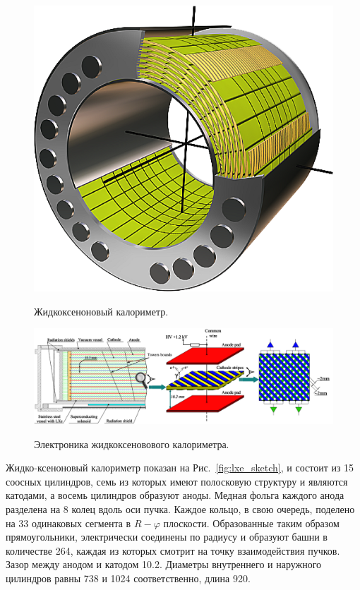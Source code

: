 \begin{figure}[htbp]
    \begin{minipage}[t]{0.27\textwidth}
        \centering
        \includegraphics[width=\textwidth]{img/cmd3_detector/lxe_sketch.png}
        \label{fig:lxe_sketch}
        \caption{Жидкоксеноновый калориметр.}
    \end{minipage}
    \hfill
    \begin{minipage}[t]{0.68\textwidth}
        \centering
        \includegraphics[width=\textwidth]{img/cmd3_detector/lxe_electrode_structure.png}
        \label{lxe_electrode_structure}
        \caption{Электроника жидкоксеновового калориметра.}
  \end{minipage}
\end{figure}

Жидко-ксеноновый калориметр показан на Рис.~\ref{fig:lxe_sketch},
и состоит из 15 соосных цилиндров,
семь из которых имеют полосковую структуру и являются катодами,
а восемь цилиндров образуют аноды.
Медная фольга каждого анода разделена на 8 колец вдоль оси пучка.
Каждое кольцо, в свою очередь,
поделено на \num{33} одинаковых сегмента в $R-\varphi$ плоскости. 
Образованные таким образом прямоугольники,
электрически соединены по радиусу и образуют башни в количестве \num{264}, каждая из которых смотрит на точку взаимодействия пучков.
Зазор между анодом и катодом \SI{10.2}{\mmr}.
Диаметры внутреннего и наружного цилиндров равны \SI{738}{\mmr} и \SI{1024}{\mmr} соответственно,
длина \SI{920}{\mmr}. 

